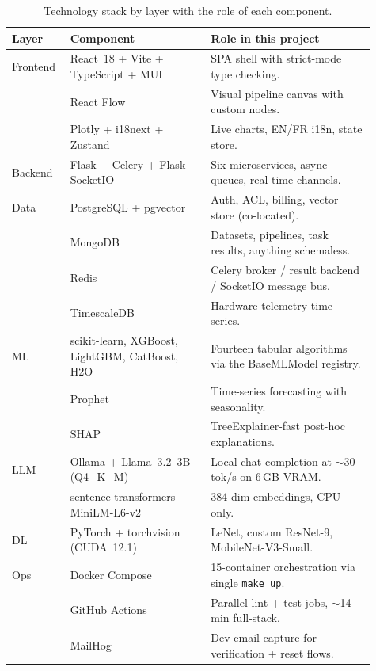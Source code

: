 \documentclass[12pt, a4paper, oneside]{report}
\begin{document}
\begin{table}[H]
\centering
\caption{Technology stack by layer with the role of each component.}
\label{tab:tech_stack}
\begin{tabular}{|p{0.13\linewidth}|L{0.36\linewidth}|L{0.42\linewidth}|}
\hline
\textbf{Layer} & \textbf{Component} & \textbf{Role in this project} \\
\hline
Frontend & React~18 + Vite + TypeScript + MUI & SPA shell with strict-mode type checking. \\ \hline
         & React Flow & Visual pipeline canvas with custom nodes. \\ \hline
         & Plotly + i18next + Zustand & Live charts, EN/FR i18n, state store. \\
\hline
Backend  & Flask + Celery + Flask-SocketIO & Six microservices, async queues, real-time channels. \\
\hline
Data     & PostgreSQL + pgvector & Auth, ACL, billing, vector store (co-located). \\ \hline
         & MongoDB & Datasets, pipelines, task results, anything schemaless. \\ \hline
         & Redis & Celery broker / result backend / SocketIO message bus. \\ \hline
         & TimescaleDB & Hardware-telemetry time series. \\
\hline
ML       & scikit-learn, XGBoost, LightGBM, CatBoost, H2O & Fourteen tabular algorithms via the BaseMLModel registry. \\ \hline
         & Prophet & Time-series forecasting with seasonality. \\ \hline
         & SHAP & TreeExplainer-fast post-hoc explanations. \\
\hline
LLM      & Ollama + Llama~3.2~3B (Q4\_K\_M) & Local chat completion at $\sim$30 tok/s on 6\,GB VRAM. \\ \hline
         & sentence-transformers MiniLM-L6-v2 & 384-dim embeddings, CPU-only. \\
\hline
DL       & PyTorch + torchvision (CUDA~12.1) & LeNet, custom ResNet-9, MobileNet-V3-Small. \\
\hline
Ops      & Docker Compose & 15-container orchestration via single \texttt{make up}. \\ \hline
         & GitHub Actions & Parallel lint + test jobs, $\sim$14\,min full-stack. \\ \hline
         & MailHog & Dev email capture for verification + reset flows. \\
\hline
\end{tabular}
\end{table}
\end{document}
